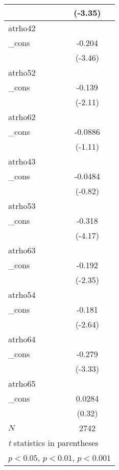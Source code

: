{\begin{tabular}{l*{1}{c}}
            &     (-3.35)         \\
\hline
atrho42     &                     \\
\_cons      &      -0.204\sym{***}\\
            &     (-3.46)         \\
\hline
atrho52     &                     \\
\_cons      &      -0.139\sym{*}  \\
            &     (-2.11)         \\
\hline
atrho62     &                     \\
\_cons      &     -0.0886         \\
            &     (-1.11)         \\
\hline
atrho43     &                     \\
\_cons      &     -0.0484         \\
            &     (-0.82)         \\
\hline
atrho53     &                     \\
\_cons      &      -0.318\sym{***}\\
            &     (-4.17)         \\
\hline
atrho63     &                     \\
\_cons      &      -0.192\sym{*}  \\
            &     (-2.35)         \\
\hline
atrho54     &                     \\
\_cons      &      -0.181\sym{**} \\
            &     (-2.64)         \\
\hline
atrho64     &                     \\
\_cons      &      -0.279\sym{***}\\
            &     (-3.33)         \\
\hline
atrho65     &                     \\
\_cons      &      0.0284         \\
            &      (0.32)         \\
\hline
\(N\)       &        2742         \\
\hline\hline
\multicolumn{2}{l}{\footnotesize \textit{t} statistics in parentheses}\\
\multicolumn{2}{l}{\footnotesize \sym{*} \(p<0.05\), \sym{**} \(p<0.01\), \sym{***} \(p<0.001\)}\\
\end{tabular}
}
